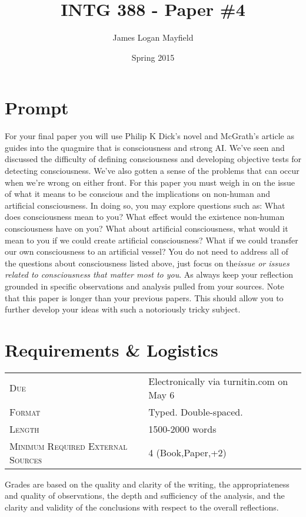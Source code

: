 \documentclass[]{tufte-handout}
\title{INTG 388 - Paper \#4 }
\author{James Logan Mayfield}
\date{ Spring 2015 }
\begin{document}
\maketitle

\section{Prompt}

For your final paper you will use Philip K Dick's novel\cite{dick_androids_2008} and McGrath's article\cite{mcgrath_religion_2011} as guides into the quagmire that is consciousness and strong AI. 	We've seen and discussed the difficulty of defining consciousness and developing objective tests for detecting consciousness. We've also gotten a sense of the problems that can occur when we're wrong on either front. For this paper you must weigh in on the issue of what it means to be conscious and the implications on non-human and artificial consciousness. In doing so, you may explore questions such as: What does consciousness mean to you? What effect would the existence non-human consciousness have on you? What about artificial consciousness, what would it mean to you if we could create artificial consciousness? What if we could transfer our own consciousness to an artificial vessel?   
You do not need to address all of the questions about consciousness listed above, just focus on the\textit{issue or issues related to consciousness that matter most to you}. As always keep your reflection grounded in specific observations and analysis pulled from your sources. Note that this paper is longer than your previous papers. This should allow you to further develop your ideas with such a notoriously tricky subject.  

\section{Requirements \& Logistics}

\begin{tabular}{ll}
\textsc{Due} & Electronically via turnitin.com on May 6  \\
\textsc{Format} & Typed. Double-spaced. \\
\textsc{Length} & 1500-2000 words \\
\textsc{Minimum Required External Sources} & 4 (Book,Paper,+2)
\end{tabular}

\vspace{.1in}
Grades are based on the quality and clarity of the writing, the appropriateness and quality of observations, the depth and sufficiency of the analysis, and the clarity and validity of the conclusions with respect to the overall reflections.  
\end{document}
